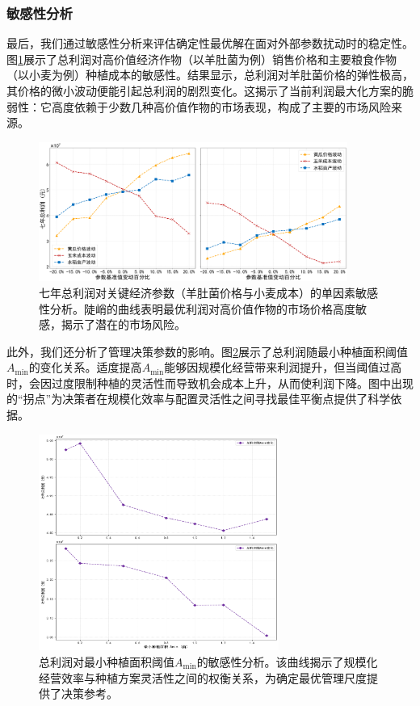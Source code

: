 \subsubsection{敏感性分析}

最后，我们通过敏感性分析来评估确定性最优解在面对外部参数扰动时的稳定性。图\ref{fig:price_sensitivity}展示了总利润对高价值经济作物（以羊肚菌为例）销售价格和主要粮食作物（以小麦为例）种植成本的敏感性。结果显示，总利润对羊肚菌价格的弹性极高，其价格的微小波动便能引起总利润的剧烈变化。这揭示了当前利润最大化方案的脆弱性：它高度依赖于少数几种高价值作物的市场表现，构成了主要的市场风险来源。

\begin{figure}[htbp]
    \centering
    \includegraphics[width=0.9\textwidth]{figures/1_1}
    \caption{七年总利润对关键经济参数（羊肚菌价格与小麦成本）的单因素敏感性分析。陡峭的曲线表明最优利润对高价值作物的市场价格高度敏感，揭示了潜在的市场风险。}
    \label{fig:price_sensitivity}
\end{figure}

此外，我们还分析了管理决策参数的影响。图\ref{fig:scale_analysis}展示了总利润随最小种植面积阈值$A_{\min}$的变化关系。适度提高$A_{\min}$能够因规模化经营带来利润提升，但当阈值过高时，会因过度限制种植的灵活性而导致机会成本上升，从而使利润下降。图中出现的“拐点”为决策者在规模化效率与配置灵活性之间寻找最佳平衡点提供了科学依据。

\begin{figure}[htbp]
    \centering
    \includegraphics[width=0.7\textwidth]{figures/1_2}
    \caption{总利润对最小种植面积阈值$A_{\min}$的敏感性分析。该曲线揭示了规模化经营效率与种植方案灵活性之间的权衡关系，为确定最优管理尺度提供了决策参考。}
    \label{fig:scale_analysis}
\end{figure}






